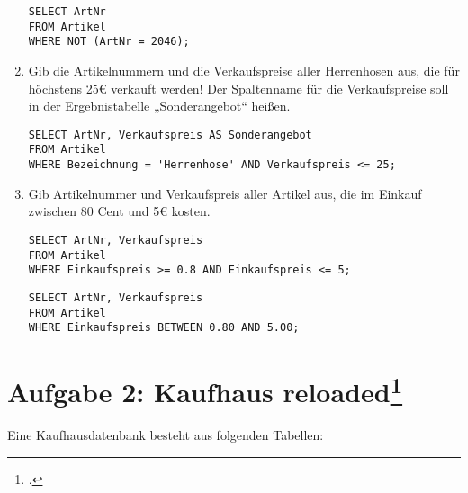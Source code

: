 \documentclass{lehramt-informatik-haupt}
\begin{document}
\begin{enumerate}
\begin{antwort}[muster]
\begin{verbatim}
SELECT ArtNr
FROM Artikel
WHERE NOT (ArtNr = 2046);
\end{verbatim}
\end{antwort}


\item Gib die Artikelnummern und die Verkaufspreise aller Herrenhosen
aus, die für höchstens 25€ verkauft werden! Der Spaltenname für die
Verkaufspreise soll in der Ergebnistabelle „Sonderangebot“ heißen.

\begin{antwort}[muster]
\begin{verbatim}
SELECT ArtNr, Verkaufspreis AS Sonderangebot
FROM Artikel
WHERE Bezeichnung = 'Herrenhose' AND Verkaufspreis <= 25;
\end{verbatim}
\end{antwort}


\item Gib Artikelnummer und Verkaufspreis aller Artikel aus, die im
Einkauf zwischen 80 Cent und 5€ kosten.

\begin{antwort}[richtig]
\begin{verbatim}
SELECT ArtNr, Verkaufspreis
FROM Artikel
WHERE Einkaufspreis >= 0.8 AND Einkaufspreis <= 5;
\end{verbatim}
\end{antwort}

\begin{antwort}[muster]
\begin{verbatim}
SELECT ArtNr, Verkaufspreis
FROM Artikel
WHERE Einkaufspreis BETWEEN 0.80 AND 5.00;
\end{verbatim}
\end{antwort}

\end{enumerate}

%

\section{Aufgabe 2: Kaufhaus reloaded\footcite{db:ab:2}}

Eine Kaufhausdatenbank besteht aus folgenden Tabellen:
\end{document}
